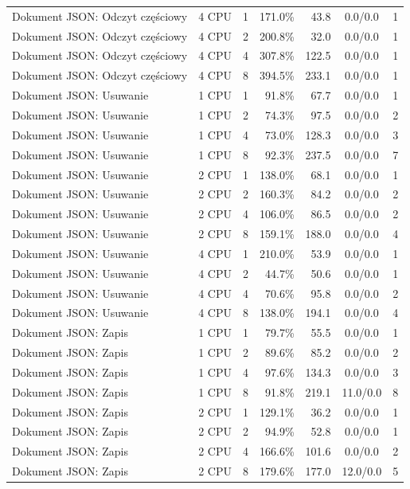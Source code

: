 \begin{table}[ht]
{\begin{tabular}{llcrrcc}
Dokument JSON: Odczyt częściowy & 4 CPU & 1 & 171.0\% & 43.8 & 0.0/0.0 & 1 \\
Dokument JSON: Odczyt częściowy & 4 CPU & 2 & 200.8\% & 32.0 & 0.0/0.0 & 1 \\
Dokument JSON: Odczyt częściowy & 4 CPU & 4 & 307.8\% & 122.5 & 0.0/0.0 & 1 \\
Dokument JSON: Odczyt częściowy & 4 CPU & 8 & 394.5\% & 233.1 & 0.0/0.0 & 1 \\
Dokument JSON: Usuwanie & 1 CPU & 1 & 91.8\% & 67.7 & 0.0/0.0 & 1 \\
Dokument JSON: Usuwanie & 1 CPU & 2 & 74.3\% & 97.5 & 0.0/0.0 & 2 \\
Dokument JSON: Usuwanie & 1 CPU & 4 & 73.0\% & 128.3 & 0.0/0.0 & 3 \\
Dokument JSON: Usuwanie & 1 CPU & 8 & 92.3\% & 237.5 & 0.0/0.0 & 7 \\
Dokument JSON: Usuwanie & 2 CPU & 1 & 138.0\% & 68.1 & 0.0/0.0 & 1 \\
Dokument JSON: Usuwanie & 2 CPU & 2 & 160.3\% & 84.2 & 0.0/0.0 & 2 \\
Dokument JSON: Usuwanie & 2 CPU & 4 & 106.0\% & 86.5 & 0.0/0.0 & 2 \\
Dokument JSON: Usuwanie & 2 CPU & 8 & 159.1\% & 188.0 & 0.0/0.0 & 4 \\
Dokument JSON: Usuwanie & 4 CPU & 1 & 210.0\% & 53.9 & 0.0/0.0 & 1 \\
Dokument JSON: Usuwanie & 4 CPU & 2 & 44.7\% & 50.6 & 0.0/0.0 & 1 \\
Dokument JSON: Usuwanie & 4 CPU & 4 & 70.6\% & 95.8 & 0.0/0.0 & 2 \\
Dokument JSON: Usuwanie & 4 CPU & 8 & 138.0\% & 194.1 & 0.0/0.0 & 4 \\
Dokument JSON: Zapis & 1 CPU & 1 & 79.7\% & 55.5 & 0.0/0.0 & 1 \\
Dokument JSON: Zapis & 1 CPU & 2 & 89.6\% & 85.2 & 0.0/0.0 & 2 \\
Dokument JSON: Zapis & 1 CPU & 4 & 97.6\% & 134.3 & 0.0/0.0 & 3 \\
Dokument JSON: Zapis & 1 CPU & 8 & 91.8\% & 219.1 & 11.0/0.0 & 8 \\
Dokument JSON: Zapis & 2 CPU & 1 & 129.1\% & 36.2 & 0.0/0.0 & 1 \\
Dokument JSON: Zapis & 2 CPU & 2 & 94.9\% & 52.8 & 0.0/0.0 & 1 \\
Dokument JSON: Zapis & 2 CPU & 4 & 166.6\% & 101.6 & 0.0/0.0 & 2 \\
Dokument JSON: Zapis & 2 CPU & 8 & 179.6\% & 177.0 & 12.0/0.0 & 5 \\

\end{tabular}}
\end{table}
